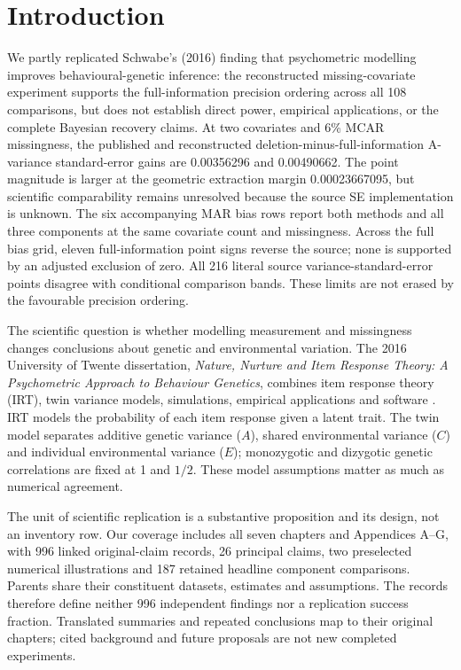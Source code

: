 \documentclass[11pt]{article}
\begin{document}
\section{Introduction}\label{sec:intro}
We partly replicated Schwabe's (2016) finding that psychometric modelling improves behavioural-genetic inference: the reconstructed missing-covariate experiment supports the full-information precision ordering across all 108 comparisons, but does not establish direct power, empirical applications, or the complete Bayesian recovery claims. At two covariates and 6\% MCAR missingness, the published and reconstructed deletion-minus-full-information A-variance standard-error gains are 0.00356296 and 0.00490662. The point magnitude is larger at the geometric extraction margin 0.00023667095, but scientific comparability remains unresolved because the source SE implementation is unknown. The six accompanying MAR bias rows report both methods and all three components at the same covariate count and missingness. Across the full bias grid, eleven full-information point signs reverse the source; none is supported by an adjusted exclusion of zero. All 216 literal source variance-standard-error points disagree with conditional comparison bands. These limits are not erased by the favourable precision ordering.

The scientific question is whether modelling measurement and missingness changes conclusions about genetic and environmental variation. The 2016 University of Twente dissertation, \emph{Nature, Nurture and Item Response Theory: A Psychometric Approach to Behaviour Genetics}, combines item response theory (IRT), twin variance models, simulations, empirical applications and software \citep{schwabe2016}. IRT models the probability of each item response given a latent trait. The twin model separates additive genetic variance ($A$), shared environmental variance ($C$) and individual environmental variance ($E$); monozygotic and dizygotic genetic correlations are fixed at 1 and $1/2$. These model assumptions matter as much as numerical agreement.

The unit of scientific replication is a substantive proposition and its design, not an inventory row. Our coverage includes all seven chapters and Appendices A--G, with 996 linked original-claim records, 26 principal claims, two preselected numerical illustrations and 187 retained headline component comparisons. Parents share their constituent datasets, estimates and assumptions. The records therefore define neither 996 independent findings nor a replication success fraction. Translated summaries and repeated conclusions map to their original chapters; cited background and future proposals are not new completed experiments.
\end{document}
